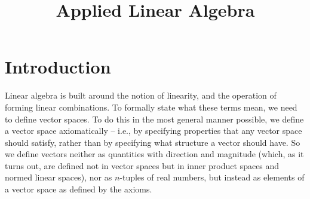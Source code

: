 \documentclass[svgnames]{article}
\theoremstyle{definition}
\theoremstyle{remark}
\newcommand{\newterm}[1]{{\color{alertcolor} #1}}
\begin{document}
\title{\textbf{Applied Linear Algebra}}

\date{}
\maketitle

\begingroup
\let\clearpage\relax
\tableofcontents
\endgroup

\clearpage

\renewcommand{\nomname}{List of Symbols}
\printnomenclature[10em]

\clearpage

\section{Introduction}\label{sec:Intro}
Linear algebra is built around the notion of linearity, and the operation of forming linear combinations. To formally state what these terms mean, we need to define \newterm{vector spaces}. To do this in the most general manner possible, we define a vector space \newterm{axiomatically} -- i.e., by specifying properties that any vector space should satisfy, rather than by specifying what structure a vector should have. So we define vectors neither as quantities with direction and magnitude (which, as it turns out, are defined not in vector spaces but in inner product spaces and normed linear spaces), nor as $n$-tuples of real numbers, but instead as elements of a vector space as defined by the axioms.
\end{document}
